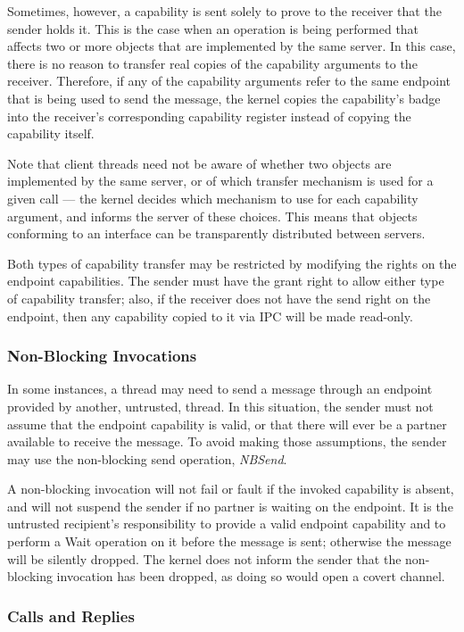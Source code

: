Sometimes, however, a capability is sent solely to prove to the receiver that the sender holds it. This is the case when an operation is being performed that affects two or more objects that are implemented by the same server. In this case, there is no reason to transfer real copies of the capability arguments to the receiver. Therefore, if any of the capability arguments refer to the same endpoint that is being used to send the message, the kernel copies the capability's badge into the receiver's corresponding capability register instead of copying the capability itself.

Note that client threads need not be aware of whether two objects are implemented by the same server, or of which transfer mechanism is used for a given call --- the kernel decides which mechanism to use for each capability argument, and informs the server of these choices. This means that objects conforming to an interface can be transparently distributed between servers.

Both types of capability transfer may be restricted by modifying the rights on the endpoint capabilities. The sender must have the grant right to allow either type of capability transfer; also, if the receiver does not have the send right on the endpoint, then any capability copied to it via IPC will be made read-only.

\subsubsection{Non-Blocking Invocations}

In some instances, a thread may need to send a message through an endpoint
provided by another, untrusted, thread. In this situation, the sender must not
assume that the endpoint capability is valid, or that there will ever be a
partner available to receive the message. To avoid making those assumptions,
the sender may use the non-blocking send operation, \emph{NBSend}.

A non-blocking invocation
will not fail or fault if the invoked capability is absent, and will not
suspend the sender if no partner is waiting on the endpoint. It is the
untrusted recipient's responsibility to provide a valid endpoint capability
and to perform a Wait operation on it before the message is sent; otherwise
the message will be silently dropped. The kernel does not inform the sender
that the non-blocking invocation has been dropped, as doing so would open a
covert channel.

\subsubsection{Calls and Replies}

